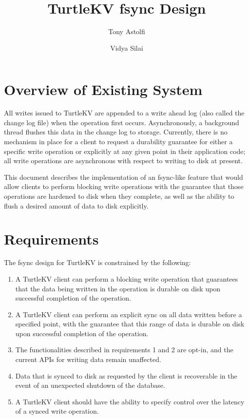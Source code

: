 \documentclass[11pt]{article}
\title{TurtleKV fsync Design}
\author{
Tony Astolfi
\and
Vidya Silai
}
\begin{document}
\maketitle{}

\section{Overview of Existing System}

All writes issued to TurtleKV are appended to a write ahead log (also called the change log file) when the operation first occurs. Asynchronously, a background thread flushes this data in the change log to storage. Currently, there is no mechanism in place for a client to request a durability guarantee for either a specific write operation or explicitly at any given point in their application code; all write operations are asynchronous with respect to writing to disk at present.

This document describes the implementation of an fsync-like feature that would allow clients to perform blocking write operations with the guarantee that those operations are hardened to disk when they complete, as well as the ability to flush a desired amount of data to disk explicitly.

\section{Requirements}

The fsync design for TurtleKV is constrained by the following:

\begin{enumerate}
	\item[R1.] A TurtleKV client can perform a blocking write operation that guarantees that the data being written in the operation is durable on disk upon successful completion of the operation.
    \item[R2.] A TurtleKV client can perform an explicit sync on all data written before a specified point, with the guarantee that this range of data is durable on disk upon successful completion of the operation.
    \item[R3.] The functionalities described in requirements 1 and 2 are opt-in, and the current APIs for writing data remain unaffected.
    \item[R4.] Data that is synced to disk as requested by the client is recoverable in the event of an unexpected shutdown of the database.
    \item[R5.] A TurtleKV client should have the ability to specify control over the latency of a synced write operation.
\end{enumerate}
\end{document}
